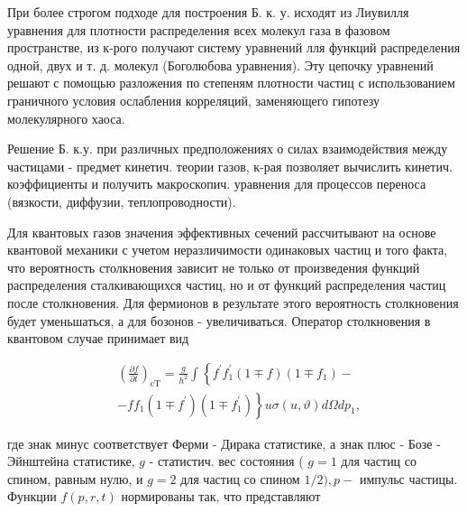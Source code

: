 \documentclass[10pt]{article}
\begin{document}
При более строгом подходе для построения Б. к. у. исходят из Лиувилля уравнения для плотности распределения всех молекул газа в фазовом пространстве, из к-рого получают систему уравнений лля функций распределения одной, двух и т. д. молекул (Боголюбова уравнения). Эту цепочку уравнений решают с помощью разложения по степеням плотности частиц с использованием граничного условия ослабления корреляций, заменяющего гипотезу молекулярного хаоса.



Решение Б. к.у. при различных предположениях о силах взаимодействия между частицами - предмет кинетич. теории газов, к-рая позволяет вычислить кинетич. коэффициенты и получить макроскопич. уравнения для процессов переноса (вязкости, диффузии, теплопроводности).



Для квантовых газов значения эффективных сечений рассчитывают на основе квантовой механики с учетом неразличимости одинаковых частиц и того факта, что вероятность столкновения зависит не только от произведения функций распределения сталкивающихся частиц, но и от функций распределения частиц после столкновения. Для фермионов в результате этого вероятность столкновения будет уменьшаться, а для бозонов - увеличиваться. Оператор столкновения в квантовом случае принимает вид



\[

\begin{aligned}

& \left(\frac{\partial f}{\partial t}\right)_{\mathrm{cT}}=\frac{g}{h^{2}} \int\left\{f^{\prime} f_{1}^{\prime}(1 \mp f)\left(1 \mp f_{1}\right)-\right. \\

& \left.-f f_{1}\left(1 \mp f^{\prime}\right)\left(1 \mp f_{1}^{\prime}\right)\right\} u \sigma(u, \vartheta) d \Omega d p_{1},

\end{aligned}

\]



где знак минус соответствует Ферми - Дирака статистике, а знак плюс - Бозе - Эйнштейна статистике, $g$ - статистич. вес состояния ( $g=1$ для частиц со спином, равным нулю, и $g=2$ для частиц со спином $1 / 2), p-$ импульс частицы. Функции $f(p, r, t)$ нормированы так, что представляют
\end{document}
